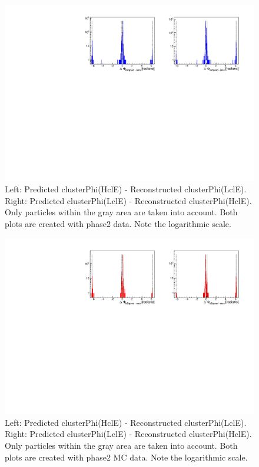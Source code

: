 \documentclass[a4paper,11pt,twosided,final,german,openbib,pdftex,listof=totoc,bibliography=totoc]{scrbook}
\begin{document}
\begin{appendix}
\begin{figure}[h!]
	\centering
	\includegraphics[width=\textwidth]{Plots/master/sb2b_Data_0.pdf}
	\caption[b2bClusterPhi - clusterPhi For Data (Whole Range)]{Left: Predicted clusterPhi(HclE) - Reconstructed clusterPhi(LclE). Right: Predicted clusterPhi(LclE) - Reconstructed clusterPhi(HclE). Only particles within the gray area are taken into account. Both plots are created with phase2 data. Note the logarithmic scale.}
	\label{fig:b2bData_Whole}
\end{figure}






\begin{figure}[!htbp]
	\centering
	\includegraphics[width=\textwidth]{Plots/master/sb2b_MC_0.pdf}
	\caption[b2bClusterPhi - clusterPhi For MC (Whole Range)]{Left: Predicted clusterPhi(HclE) - Reconstructed clusterPhi(LclE). Right: Predicted clusterPhi(LclE) - Reconstructed clusterPhi(HclE). Only particles within the gray area are taken into account. Both plots are created with phase2 MC data. Note the logarithmic scale.}
	\label{fig:b2bMC_Whole}
\end{figure}
\newpage




\end{appendix}
\end{document}
